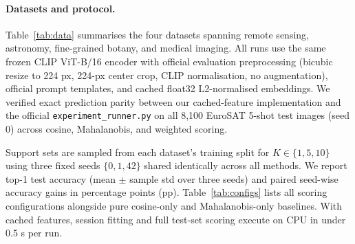 \documentclass[letterpaper]{article} %
\begin{document}
\paragraph{Datasets and protocol.}
Table~\ref{tab:data} summarises the four datasets spanning remote sensing, astronomy, fine-grained botany, and medical imaging. All runs use the same frozen CLIP ViT-B/16 encoder with official evaluation preprocessing (bicubic resize to 224 px, 224-px center crop, CLIP normalisation, no augmentation), official prompt templates, and cached float32 L2-normalised embeddings. We verified exact prediction parity between our cached-feature implementation and the official \texttt{experiment\_runner.py} \citep{hycalcode} on all 8,100 EuroSAT 5-shot test images (seed 0) across cosine, Mahalanobis, and weighted scoring.

Support sets are sampled from each dataset's training split for $K \in \{1, 5, 10\}$ using three fixed seeds $\{0, 1, 42\}$ shared identically across all methods. We report top-1 test accuracy (mean $\pm$ sample std over three seeds) and paired seed-wise accuracy gains in percentage points (pp). Table~\ref{tab:configs} lists all scoring configurations alongside pure cosine-only and Mahalanobis-only baselines. With cached features, session fitting and full test-set scoring execute on CPU in under 0.5 s per run.
\end{document}
